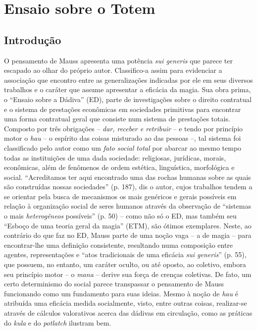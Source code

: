 \section{Ensaio sobre o Totem}
\subsection{Introdução}

O pensamento de Mauss apresenta uma potência \textit{sui generis} que parece ter escapado ao olhar do próprio autor.
Classifico-a assim para evidenciar a associação que encontro entre as generalizações indicadas por ele em seus diversos trabalhos e o caráter que assume apresentar a eficácia da magia.
Sua obra prima, o \enquote{Ensaio sobre a Dádiva} (ED), parte de investigações sobre o direito contratual e o sistema de prestações econômicas em sociedades primitivas para encontrar uma forma contratual geral que consiste num sistema de prestações totais.
Composto por três obrigações -- \textit{dar, receber e retribuir} -- e tendo por princípio motor o \textit{hau} -- o espírito das coisas misturado ao das pessoas --, tal sistema foi classificado pelo autor como um \textit{fato social total} por abarcar ao mesmo tempo todas as instituições de uma dada sociedade:
religiosas, jurídicas, morais, econômicas, além de fenômenos de ordem estética, linguística, morfológica e social.
\enquote{Acreditamos ter aqui encontrado uma das rochas humanas sobre as quais são construídas nossas sociedades} (p. 187), dis o autor, cujos trabalhos tendem a se orientar pela busca de mecanismos os mais genéricos e gerais possíveis em relação à organização social de seres humanos através da observação de \enquote{sistemas o mais \textit{heterogêneos} possíveis} (p. 50) -- como não só o ED, mas também seu \enquote{Esboço de uma teoria geral da magia} (ETM), são ótimos exemplares.
Neste, ao contrário do que faz no ED, Mauss parte de uma noção vaga -- a de magia -- para encontrar-lhe uma definição consistente, resultando numa composição entre agentes, representações e \enquote{atos tradicionais de uma eficácia \textit{sui generis}} (p. 55), que possuem, no entanto, um caráter oculto, ou até oposto, ao coletivo, embora seu princípio motor -- o \textit{mana} -- derive sua força de crenças coletivas.
De fato, um certo determinismo do social parece transpassar o pensamento de Mauss funcionando como um fundamento para suas ideias.
Mesmo à noção de \textit{hau} é atribuída uma eficácia medida socialmente, visto, entre outras coisas, realizar-se através de cálculos valorativos acerca das dádivas em circulação, como as práticas do \textit{kula} e do \textit{potlatch} ilustram bem.
